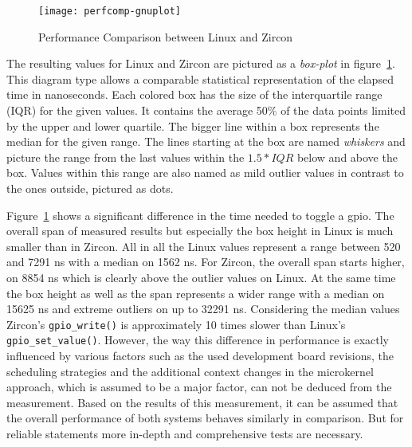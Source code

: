 \begin{figure} [t]
    \centering
    \texttt{[image: perfcomp-gnuplot]}
    \caption{Performance Comparison between Linux and Zircon}\label{pic:perftest}
\end{figure}

The resulting values for Linux and Zircon are pictured as a \textit{box-plot} in figure~\ref{pic:perftest}.
This diagram type allows a comparable statistical representation of the elapsed time in nanoseconds.
Each colored box has the size of the interquartile range (IQR) for the given values.
It contains the average 50\% of the data points limited by the upper and lower quartile.
The bigger line within a box represents the median for the given range.
The lines starting at the box are named \textit{whiskers} and picture the range from the last values within the $1.5 * IQR$ below and above the box.
Values within this range are also named as mild outlier values in contrast to the ones outside, pictured as dots. 

Figure~\ref{pic:perftest} shows a significant difference in the time needed to toggle a \ac{gpio}.
The overall span of measured results but especially the box height in Linux is much smaller than in Zircon.
All in all the Linux values represent a range between 520 and 7291 ns with a median on 1562 ns.
For Zircon, the overall span starts higher, on 8854 ns which is clearly above the outlier values on Linux.
At the same time the box height as well as the span represents a wider range with a median on 15625 ns and extreme outliers on up to 32291 ns.
Considering the median values Zircon's \texttt{gpio_write()} is approximately 10 times slower than Linux's \texttt{gpio_set_value()}.
However, the way this difference in performance is exactly influenced by various factors such as the used development board revisions, the scheduling strategies and the additional context changes in the microkernel approach, which is assumed to be a major factor, can not be deduced from the measurement.
Based on the results of this measurement, it can be assumed that the overall performance of both systems behaves similarly in comparison.
But for reliable statements more in-depth and comprehensive tests are necessary.

